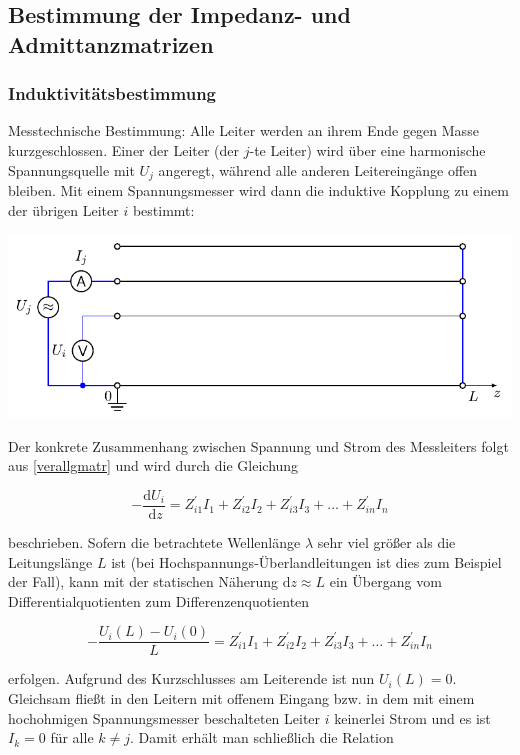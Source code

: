 \subsection{Bestimmung der Impedanz- und Admittanzmatrizen}
\subsubsection{Induktivitätsbestimmung}
Messtechnische Bestimmung: Alle Leiter werden an ihrem Ende gegen Masse kurzgeschlossen. Einer der Leiter (der $j$-te Leiter) wird über eine harmonische Spannungsquelle mit $U_{j}$ angeregt, während alle anderen Leitereingänge offen bleiben. Mit einem Spannungsmesser wird dann die induktive Kopplung zu einem der übrigen Leiter $i$ bestimmt:

\begin{center}
	\includegraphics{res/LT8}
\end{center}

Der konkrete Zusammenhang zwischen Spannung und Strom des Messleiters folgt aus \ref{verallgmatr} und wird durch die Gleichung


\begin{equation}
	-\frac{\mathrm{d} U_{i}}{\mathrm{~d} z}=Z_{i 1}^{\prime} I_{1}+Z_{i 2}^{\prime} I_{2}+Z_{i 3}^{\prime} I_{3}+\ldots+Z_{i n}^{\prime} I_{n} 
\end{equation}


beschrieben. Sofern die betrachtete Wellenlänge $\lambda$ sehr viel größer als die Leitungslänge $L$ ist (bei Hochspannungs-Überlandleitungen ist dies zum Beispiel der Fall), kann mit der statischen Näherung $\mathrm{d} z \approx L$ ein Übergang vom Differentialquotienten zum Differenzenquotienten


\begin{equation}
	-\frac{U_{i}(L)-U_{i}(0)}{L}=Z_{i 1}^{\prime} I_{1}+Z_{i 2}^{\prime} I_{2}+Z_{i 3}^{\prime} I_{3}+\ldots+Z_{i n}^{\prime} I_{n} 
\end{equation}


erfolgen. Aufgrund des Kurzschlusses am Leiterende ist nun $U_{i}(L)=0$. Gleichsam fließt in den Leitern mit offenem Eingang bzw. in dem mit einem hochohmigen Spannungsmesser beschalteten Leiter $i$ keinerlei Strom und es ist $I_{k}=0$ für alle $k \neq j$. Damit erhält man schließlich die Relation


